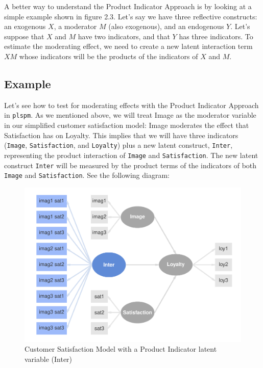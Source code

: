 \documentclass[12pt]{book}\usepackage{graphicx, color}
\newenvironment{knitrout}{}{} %
\newcommand{\plspm}{\texttt{plspm}}
\newcommand{\code}[1]{\texttt{#1}}
\begin{document}
A better way to understand the Product Indicator Approach is by looking at a simple example shown in figure 2.3. Let's say we have three reflective constructs: an exogenous $X$, a moderator $M$ (also exogenous), and an endogenous $Y$. Let's suppose that $X$ and $M$ have two indicators, and that $Y$ has three indicators. To estimate the moderating effect, we need to create a new latent interaction term $XM$ whose indicators will be the products of the indicators of $X$ and $M$.


\subsection{Example}
Let's see how to test for moderating effects with the Product Indicator Approach in \plspm{}. As we mentioned above, we will treat Image as the moderator variable in our simplified customer satisfaction model: Image moderates the effect that Satisfaction has on Loyalty. This implies that we will have three indicators (\code{Image}, \code{Satisfaction}, and \code{Loyalty}) plus a new latent construct, \texttt{Inter}, representing the product interaction of \code{Image} and \code{Satisfaction}. The new latent construct \texttt{Inter} will be measured by the product terms of the indicators of both \texttt{Image} and \texttt{Satisfaction}. See the following diagram:




\begin{knitrout}
\color{fgcolor}\begin{figure}[h]


{\centering \includegraphics[width=.8\linewidth,height=.6\linewidth]{figure/prod_ind_app_sat_diag} 

}

\caption[Customer Satisfaction Model with a Product Indicator latent variable (Inter)]{Customer Satisfaction Model with a Product Indicator latent variable (Inter)\label{fig:prod_ind_app_sat_diag}}
\end{figure}


\end{knitrout}
\end{document}
